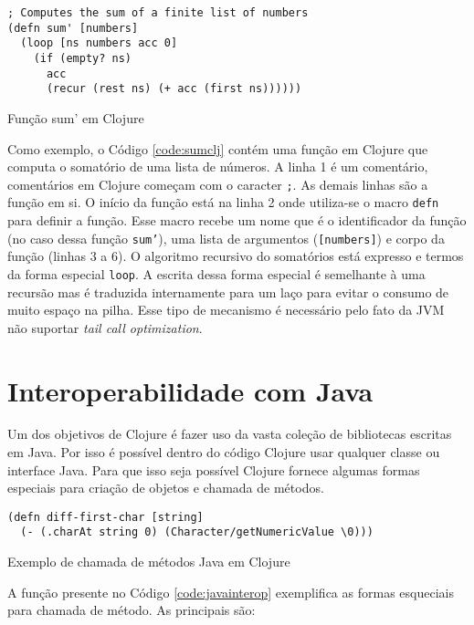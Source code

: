 \begin{listing}
  \begin{verbatim}
; Computes the sum of a finite list of numbers
(defn sum' [numbers]
  (loop [ns numbers acc 0]
    (if (empty? ns)
      acc
      (recur (rest ns) (+ acc (first ns))))))
  \end{verbatim}
  \caption{Função sum' em Clojure}
  \label{code:sumclj}
\end{listing}

Como exemplo, o Código \ref{code:sumclj} contém uma função em Clojure que computa o somatório de uma lista de números. A linha 1 é um comentário, comentários em Clojure começam com o caracter \verb|;|. As demais linhas são a função em si. O início da função está na linha 2 onde utiliza-se o macro \verb|defn| para definir a função. Esse macro recebe um nome que é o identificador da função (no caso dessa função \verb|sum’|), uma lista de argumentos (\verb|[numbers]|) e corpo da função (linhas 3 a 6). O algoritmo recursivo do somatórios está expresso e termos da forma especial \verb|loop|. A escrita dessa forma especial é semelhante à uma recursão mas é traduzida internamente para um laço para evitar o consumo de muito espaço na pilha. Esse tipo de mecanismo é necessário pelo fato da JVM não suportar \emph{tail call optimization}.


\section{Interoperabilidade com Java}

Um dos objetivos de Clojure é fazer uso da vasta coleção de bibliotecas escritas em Java. Por isso é possível dentro do código Clojure usar qualquer classe ou interface Java. Para que isso seja possível Clojure fornece algumas formas especiais para criação de objetos e chamada de métodos.

\begin{listing}
  \begin{verbatim}
(defn diff-first-char [string]
  (- (.charAt string 0) (Character/getNumericValue \0)))
  \end{verbatim}
  \caption{Exemplo de chamada de métodos Java em Clojure}
  \label{code:javainterop}
\end{listing}

A função presente no Código \ref{code:javainterop} exemplifica as formas esqueciais para chamada de método. As principais são:

